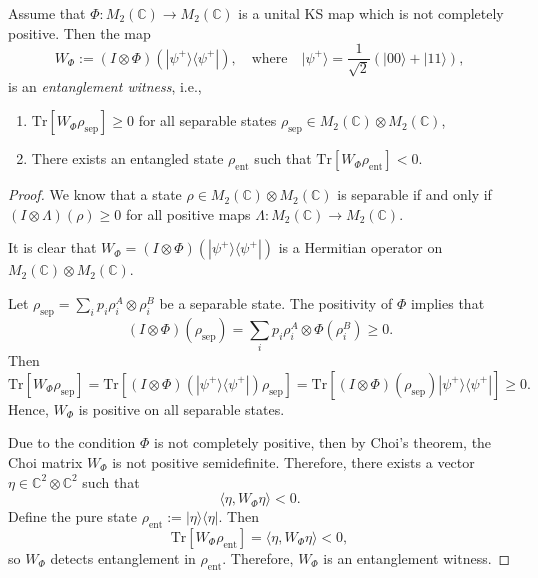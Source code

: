 \documentclass[10pt,a4paper]{amsart}
\begin{document}
\begin{proposition}
Assume that $\Phi: M_2(\mathbb{C}) \to M_2(\mathbb{C})$ is a unital KS map which is not completely positive. Then the map
\[
W_\Phi := (I \otimes \Phi)(|\psi^+\rangle\langle\psi^+|), \quad \text{where} \quad |\psi^+\rangle = \frac{1}{\sqrt{2}}(|00\rangle + |11\rangle),
\]
is an \emph{entanglement witness}, i.e.,
\begin{enumerate}
    \item $\mathrm{Tr}[W_\Phi \rho_{\mathrm{sep}}] \geq 0$ for all separable states $\rho_{\mathrm{sep}} \in M_2(\mathbb{C}) \otimes M_2(\mathbb{C})$,
    \item There exists an entangled state $\rho_{\mathrm{ent}}$ such that $\mathrm{Tr}[W_\Phi \rho_{\mathrm{ent}}] < 0$.
\end{enumerate}
\end{proposition}

\begin{proof}
We know that a state $\rho \in M_2(\mathbb{C}) \otimes M_2(\mathbb{C})$ is separable if and only if $(I \otimes \Lambda)(\rho) \geq 0$ for all positive maps $\Lambda: M_2(\mathbb{C}) \to M_2(\mathbb{C})$.

It is clear that $W_\Phi = (I \otimes \Phi)(|\psi^+\rangle\langle\psi^+|)$ is a Hermitian operator on $M_2(\mathbb{C}) \otimes M_2(\mathbb{C})$.

Let $\rho_{\mathrm{sep}} = \sum_i p_i \rho_i^A \otimes \rho_i^B$ be a separable state. The positivity of $\Phi$ implies that
\[
(I \otimes \Phi)(\rho_{\mathrm{sep}}) = \sum_i p_i \rho_i^A \otimes \Phi(\rho_i^B) \geq 0.
\]
Then
\[
\mathrm{Tr}[W_\Phi \rho_{\mathrm{sep}}] = \mathrm{Tr}[(I \otimes \Phi)(|\psi^+\rangle\langle\psi^+|)\rho_{\mathrm{sep}}] = \mathrm{Tr}[(I \otimes \Phi)(\rho_{\mathrm{sep}}) |\psi^+\rangle\langle\psi^+|] \geq 0.
\]
Hence, $W_\Phi$ is positive on all separable states.

Due to the condition $\Phi$ is not completely positive, then by Choi's theorem, the Choi matrix $W_\Phi$ is not positive semidefinite. Therefore, there exists a vector $\eta \in \mathbb{C}^2 \otimes \mathbb{C}^2$ such that
\[
\langle \eta, W_\Phi \eta \rangle < 0.
\]
Define the pure state $\rho_{\mathrm{ent}} := |\eta\rangle\langle\eta|$. Then
\[
\mathrm{Tr}[W_\Phi \rho_{\mathrm{ent}}] = \langle \eta, W_\Phi \eta \rangle < 0,
\]
so $W_\Phi$ detects entanglement in $\rho_{\mathrm{ent}}$. Therefore, $W_\Phi$ is an entanglement witness.

\end{proof}
\end{document}
